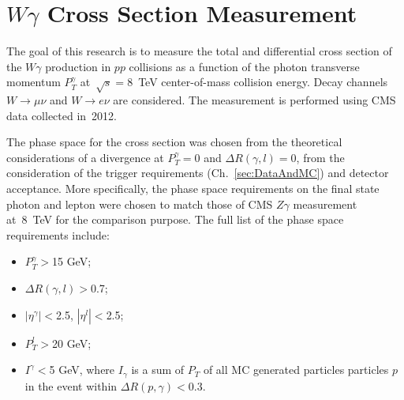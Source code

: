 \chapter{$W\gamma$ Cross Section Measurement}
\label{sec:AN_WgMeas}

The goal of this research is to measure the total and differential cross section of the $W\gamma$ production in $pp$ collisions as a function of the photon transverse momentum $P_T^\gamma$ at~$\sqrt{s}=8$~TeV center-of-mass collision energy. Decay channels $W\rightarrow\mu\nu$ and $W\rightarrow e\nu$ are considered. The measurement is performed using CMS data collected in~2012.

The phase space for the cross section was chosen from the theoretical considerations of a divergence at $P_T^{\gamma}=$0 and $\Delta{R}(\gamma,l)=$0, from the consideration of the trigger requirements (Ch.~\ref{sec:DataAndMC}) and detector acceptance. More specifically, the phase space requirements on the final state photon and lepton were chosen to match those of CMS $Z\gamma$ measurement at~8~TeV for the comparison purpose. The full list of the phase space requirements include:
\begin{itemize}
  \item $P_T^{\gamma}>$15 GeV;
  \item $\Delta{R}(\gamma,l) > $0.7;
  \item $|\eta^{\gamma}|<$2.5, $|\eta^{l}|<$2.5;
  \item $P_T^{l}>$20 GeV;
  \item $I^{\gamma}<$5 GeV, where $I_{\gamma}$ is a sum of $P_T$ of all MC generated particles particles $p$ in the event within $\Delta{R(p,\gamma)}<$0.3.
\end{itemize}

